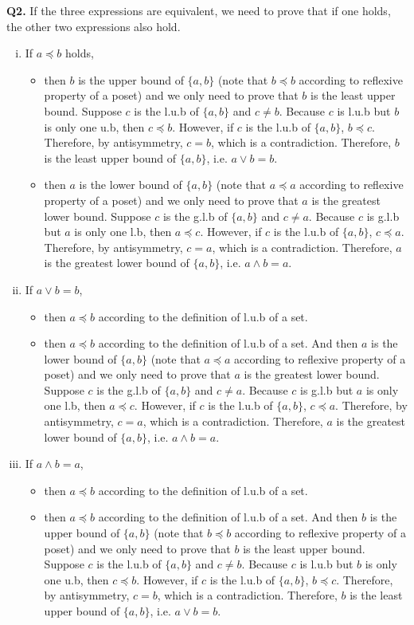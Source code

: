 \documentclass{article}[12pt]
\begin{document}
\noindent \textbf{Q2.}
If the three expressions are equivalent, we need to prove that if one holds, the other two expressions also hold.
\begin{enumerate}[(i)]
\item If $a \preceq b$ holds, 
\begin{itemize}
\item then $b$ is the upper bound of $\{a,b\}$ (note that $b\preceq b$ according to reflexive property of a poset) and we only need to prove that $b$ is the least upper bound. Suppose $c$ is the l.u.b of $\{a,b\}$ and $c\not=b$. Because $c$ is l.u.b but $b$ is only one u.b, then $c\preceq b$. However, if $c$ is the l.u.b of $\{a,b\}$, $b\preceq c$. Therefore, by antisymmetry, $c=b$, which is a contradiction. Therefore, $b$ is the least upper bound of $\{a,b\}$, i.e. $a \vee b=b$.
\item then $a$ is the lower bound of $\{a,b\}$ (note that $a\preceq a$ according to reflexive property of a poset) and we only need to prove that $a$ is the greatest lower bound. Suppose $c$ is the g.l.b of $\{a,b\}$ and $c\not=a$. Because $c$ is g.l.b but $a$ is only one l.b, then $a\preceq c$. However, if $c$ is the l.u.b of $\{a,b\}$, $c\preceq a$. Therefore, by antisymmetry, $c=a$, which is a contradiction. Therefore, $a$ is the greatest lower bound of $\{a,b\}$, i.e. $a \wedge b=a$.
\end{itemize}
\item If $a \vee b=b$, 
\begin{itemize}
\item then $a\preceq b$ according to the definition of l.u.b of a set.
\item then $a\preceq b$ according to the definition of l.u.b of a set. And then $a$ is the lower bound of $\{a,b\}$ (note that $a\preceq a$ according to reflexive property of a poset) and we only need to prove that $a$ is the greatest lower bound. Suppose $c$ is the g.l.b of $\{a,b\}$ and $c\not=a$. Because $c$ is g.l.b but $a$ is only one l.b, then $a\preceq c$. However, if $c$ is the l.u.b of $\{a,b\}$, $c\preceq a$. Therefore, by antisymmetry, $c=a$, which is a contradiction. Therefore, $a$ is the greatest lower bound of $\{a,b\}$, i.e. $a \wedge b=a$.
\end{itemize}
\item If $a\wedge b=a$, 
\begin{itemize}
\item then $a\preceq b$ according to the definition of l.u.b of a set.
\item then $a\preceq b$ according to the definition of l.u.b of a set. And then $b$ is the upper bound of $\{a,b\}$ (note that $b\preceq b$ according to reflexive property of a poset) and we only need to prove that $b$ is the least upper bound. Suppose $c$ is the l.u.b of $\{a,b\}$ and $c\not=b$. Because $c$ is l.u.b but $b$ is only one u.b, then $c\preceq b$. However, if $c$ is the l.u.b of $\{a,b\}$, $b\preceq c$. Therefore, by antisymmetry, $c=b$, which is a contradiction. Therefore, $b$ is the least upper bound of $\{a,b\}$, i.e. $a \vee b=b$.
\end{itemize}
\end{enumerate}
\end{document}
